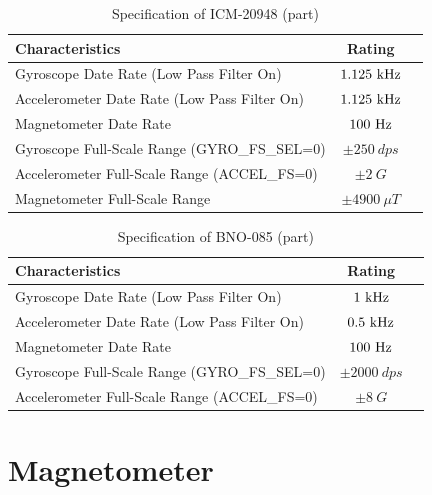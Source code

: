 \begin{table}[H]
\caption{Specification of ICM-20948 (part)} %
\centering %
\renewcommand{\arraystretch}{0.8}
\begin{tabular}{l c l} %
\hline
\textbf{Characteristics} & \textbf{Rating} \\ 
\hline %
Gyroscope Date Rate (Low Pass Filter On)& $1.125\ {\rm kHz}$ \\
Accelerometer Date Rate (Low Pass Filter On) & $1.125\ {\rm kHz}$ \\
Magnetometer Date Rate & $100\ {\rm Hz}$ \\
Gyroscope Full-Scale Range (GYRO\_FS\_SEL=0) & $\pm 250\ dps$ \\
Accelerometer Full-Scale Range (ACCEL\_FS=0) & $\pm 2\ G$ \\
Magnetometer Full-Scale Range & $\pm 4900\ \mu T$ \\

\hline
\end{tabular}
\label{table:03icm20948} %
\end{table}

\begin{table}[H]
\caption{Specification of BNO-085 (part)} %
\centering %
\renewcommand{\arraystretch}{0.8}
\begin{tabular}{l c l} %
\hline
\textbf{Characteristics} & \textbf{Rating} \\ 
\hline %
Gyroscope Date Rate (Low Pass Filter On)& $1\ {\rm kHz}$ \\
Accelerometer Date Rate (Low Pass Filter On) & $0.5\ {\rm kHz}$ \\
Magnetometer Date Rate & $100\ {\rm Hz}$ \\
Gyroscope Full-Scale Range (GYRO\_FS\_SEL=0) & $\pm 2000\ dps$ \\
Accelerometer Full-Scale Range (ACCEL\_FS=0) & $\pm 8\ G$ \\

\hline
\end{tabular}
\label{table:03bno085} %
\end{table}


\section{Magnetometer}

